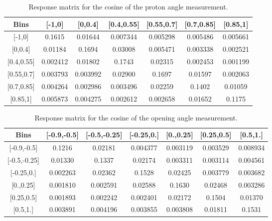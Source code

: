\documentclass[amsmath,amssymb,aps,prd,showpacs,twocolumn,superscriptaddress,letterpaper,longbibliography, floatfix]{revtex4-2}
\begin{document}
\FloatBarrier
\begin{table}[H]
\caption{Response matrix for the cosine of the proton angle measurement.} \label{tbl:RepAp}
\begin{center} \begin{tabular}{|c|c|c|c|c|c|c|}
\hline
Bins & [-1,0] & [0,0.4]& [0.4,0.55]& [0.55,0.7]& [0.7,0.85]& [0.85,1]\\\hline
{[-1,0]} &  0.1615& 0.01644& 0.007344& 0.005298& 0.005486& 0.005661 	\\
{[0,0.4]}  &0.01184& 0.1694& 0.03008& 0.005471& 0.003338& 0.002521 \\
{[0.4,0.55]}  &0.002412& 0.01802& 0.1743& 0.02315& 0.002453& 0.001199  \\
{[0.55,0.7]}  &0.003793& 0.003992& 0.02900& 0.1697& 0.01597& 0.002063 \\
{[0.7,0.85]}  &0.004264& 0.002986& 0.003496& 0.02259& 0.1402& 0.01059 \\
{[0.85,1]}  &0.005873& 0.004275& 0.002612& 0.002658& 0.01652& 0.1175\\
\hline
\end{tabular} \end{center}
\end{table}
\FloatBarrier
\begin{table}[H]
\caption{Response matrix for the cosine of the opening angle measurement.} \label{tbl:RepAep}
\begin{center} \begin{tabular}{|c|c|c|c|c|c|c|}
\hline
Bins & [-0.9,-0.5] & [-0.5,-0.25]& [-0.25,0.]& [0.,0.25]& [0.25,0.5]& [0.5,1.]\\\hline
{[-0.9,-0.5]} &  0.1216& 0.02181& 0.004377& 0.003119& 0.003529& 0.008934 \\
{[-0.5,-0.25]}  &0.01330& 0.1337&0.02174&0.003311& 0.003114& 0.004561  \\
{[-0.25,0.]}  &0.002263& 0.02362& 0.1528& 0.02425&0.003779& 0.003682  \\
{[0.,0.25]}  &0.001810& 0.002591& 0.02588& 0.1630&0.02468& 0.003286  \\
{[0.25,0.5]}  &0.001893& 0.002242& 0.002401& 0.02172&0.1504& 0.01370  \\
{[0.5,1.]}  &0.003891& 0.004196& 0.003855&0.003808& 0.01811& 0.1531 \\
\hline
\end{tabular} \end{center}
\end{table}
\FloatBarrier
\end{document}

